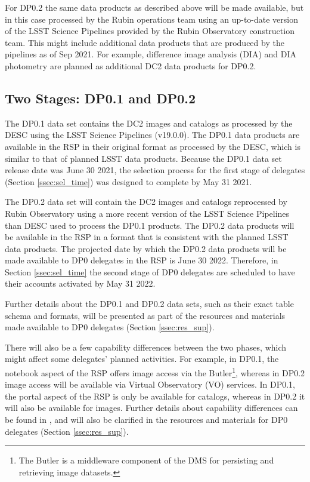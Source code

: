\documentclass[DM,lsstdraft,authoryear,toc]{lsstdoc}
\begin{document}
For DP0.2 the same data products as described above will be made available, but in this case processed by the Rubin operations team using an up-to-date version of the LSST Science Pipelines provided by the Rubin Observatory construction team.
This might include additional data products that are produced by the pipelines as of Sep 2021.
For example, difference image analysis (DIA) and DIA photometry are planned as additional DC2 data products for DP0.2.

\subsection{Two Stages: DP0.1 and DP0.2}\label{ssec:intro_stages}

The DP0.1 data set contains the DC2 images and catalogs as processed by the DESC using the LSST Science Pipelines (v19.0.0).
The DP0.1 data products are available in the RSP in their original format as processed by the DESC, which is similar to that of planned LSST data products.
Because the DP0.1 data set release date was June 30 2021, the selection process for the first stage of delegates (Section \ref{ssec:sel_time}) was designed to complete by May 31 2021.

The DP0.2 data set will contain the DC2 images and catalogs reprocessed by Rubin Observatory using a more recent version of the LSST Science Pipelines than DESC used to process the DP0.1 products.
The DP0.2 data products will be available in the RSP in a format that is consistent with the planned LSST data products.
The projected date by which the DP0.2 data products will be made available to DP0 delegates in the RSP is June 30 2022. 
Therefore, in Section \ref{ssec:sel_time} the second stage of DP0 delegates are scheduled to have their accounts activated by May 31 2022.

Further details about the DP0.1 and DP0.2 data sets, such as their exact table schema and formats, will be presented as part of the resources and materials made available to DP0 delegates (Section \ref{ssec:res_sup}).

There will also be a few capability differences between the two phases, which might affect some delegates' planned activities.
For example, in DP0.1, the notebook aspect of the RSP offers image access via the Butler\footnote{The Butler is a middleware component of the DMS for persisting and retrieving image datasets.}, whereas in DP0.2 image access will be available via Virtual Observatory (VO) services.
In DP0.1, the portal aspect of the RSP is only be available for catalogs, whereas in DP0.2 it will also be available for images.
Further details about capability differences can be found in , and will also be clarified in the resources and materials for DP0 delegates (Section \ref{ssec:res_sup}).
\end{document}
